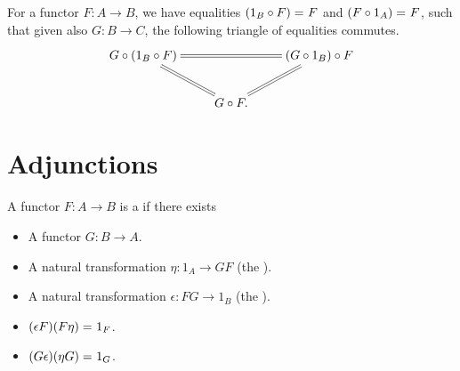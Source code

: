 \documentclass[hott-all.tex]{subfiles}
\begin{document}
\begin{lem}\label{ct:units}
  For a functor $F:A\to B$, we have equalities $(1_B\circ F) =_{} F$ and $(F\circ 1_A) =_{} F$, such that given also $G:B\to C$, the following triangle of equalities commutes.
  \[ \xymatrix{
    G\circ (1_B \circ F) \ar@{=}[rr] \ar@{=}[dr] &&
    (G\circ 1_B)\circ F \ar@{=}[dl] \\
    & G \circ F.}
  \]
\end{lem}



\section{Adjunctions}
\label{sec:adjunctions}


\begin{defn}\label{ct:adjoints}
  A functor $F:A\to B$ is a 
  if there exists
  \begin{itemize}
  \item A functor $G:B\to A$.
  \item A natural transformation $\eta:1_A \to GF$ (the ).
  \item A natural transformation $\epsilon:FG\to 1_B$ (the ).
  \item $(\epsilon F)(F\eta) =_{} 1_F$.
  \item $(G\epsilon)(\eta G) =_{} 1_G$.
  \end{itemize}
\end{defn}

\end{document}
